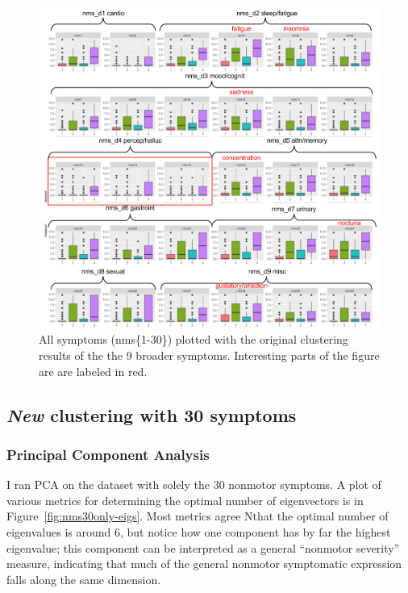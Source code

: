 \documentclass[10pt]{article}
\begin{document}
\begin{multicols}{2}
\begin{figure}[p]
  \centering
  \includegraphics[width=\linewidth]{d9to30.png}
  \caption{All symptoms (nms\{1-30\}) plotted with the original clustering results of the the 9
broader symptoms. Interesting parts of the figure are are labeled in red.}
  \label{fig:d9to30}
\end{figure}

\subsection{\emph{New} clustering with 30 symptoms}

\subsubsection{Principal Component Analysis}

I ran PCA on the dataset with solely the 30 nonmotor symptoms. A plot of various metrics for
determining the optimal number of eigenvectors is in Figure~\ref{fig:nms30only-eigs}. Most metrics agree
Nthat the optimal number of eigenvalues is around 6, but notice how one component has by far the
highest eigenvalue; this component can be interpreted as a general ``nonmotor severity'' measure,
indicating that much of the general nonmotor symptomatic expression falls along the same dimension.


\end{multicols}
\end{document}
